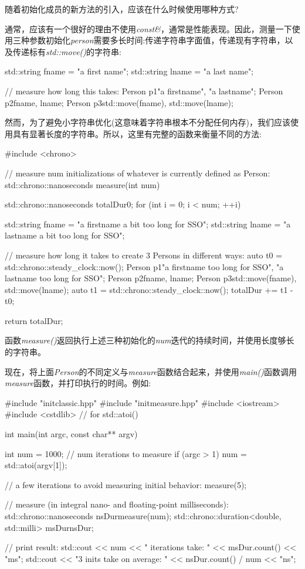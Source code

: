 随着初始化成员的新方法的引入，应该在什么时候使用哪种方式?

通常，应该有一个很好的理由不使用\textit{const\&}，通常是性能表现。因此，测量一下使用三种参数初始化\textit{person}需要多长时间:传递字符串字面值，传递现有字符串，以及传递标有\textit{std::move()}的字符串:

\begin{cppcode}
std::string fname = "a first name";
std::string lname = "a last name";

// measure how long this takes:
Person p1{"a firstname", "a lastname"};
Person p2{fname, lname};
Person p3{std::move(fname), std::move(lname)};
\end{cppcode}

然而，为了避免小字符串优化(这意味着字符串根本不分配任何内存)，我们应该使用具有显著长度的字符串。所以，这里有完整的函数来衡量不同的方法:

\begin{cppcode}
#include <chrono>

// measure num initializations of whatever is currently defined as Person:
std::chrono::nanoseconds measure(int num)
{
	std::chrono::nanoseconds totalDur{0};
	for (int i = 0; i < num; ++i) {
		std::string fname = "a firstname a bit too long for SSO";
		std::string lname = "a lastname a bit too long for SSO";

		// measure how long it takes to create 3 Persons in different ways:
		auto t0 = std::chrono::steady_clock::now();
		Person p1{"a firstname too long for SSO", "a lastname too long for SSO"};
		Person p2{fname, lname};
		Person p3{std::move(fname), std::move(lname)};
		auto t1 = std::chrono::steady_clock::now();
		totalDur += t1 - t0;
	}
	return totalDur;
}
\end{cppcode}

函数\textit{measure()}返回执行上述三种初始化的\textit{num}迭代的持续时间，并使用长度够长的字符串。

现在，将上面\textit{Person}的不同定义与\textit{measure}函数结合起来，并使用\textit{main()}函数调用\textit{measure}函数，并打印执行的时间。例如:

\begin{cppcode}
#include "initclassic.hpp"
#include "initmeasure.hpp"
#include <iostream>
#include <cstdlib> // for std::atoi()

int main(int argc, const char** argv)
{
	int num = 1000; // num iterations to measure
	if (argc > 1) {
		num = std::atoi(argv[1]);
	}

	// a few iterations to avoid measuring initial behavior:
	measure(5);

	// measure (in integral nano- and floating-point milliseconds):
	std::chrono::nanoseconds nsDur{measure(num)};
	std::chrono::duration<double, std::milli> msDur{nsDur};

	// print result:
	std::cout << num << " iterations take: "
	<< msDur.count() << "ms\n";
	std::cout << "3 inits take on average: "
	<< nsDur.count() / num << "ns\n";
}
\end{cppcode}

